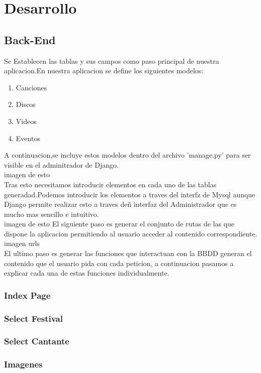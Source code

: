 \section{Desarrollo}
\subsection{Back-End}
Se Establecen las tablas y sus campos como paso principal de nuestra aplicacion.En nuestra aplicacion se define los siguientes modelos:
\begin{enumerate}
\item Canciones
\item Discos
\item Videos
\item Eventos
\end{enumerate}
A continuacion,se incluye estos modelos dentro del archivo 'manage.py' para ser visible en el adminitrador de Django.
\\imagen de esto
\\Tras esto necesitamos introducir elementos en cada uno de las tablas generadad.Podemos introducir los elementos a traves del interfz de Mysql aunque Django permite realizar esto a traves deñ interfaz del Administrador que es mucho mas sencillo e intuitivo.
\\imagen de esto
El siguiente paso es generar el conjunto de rutas de las que dispone la aplicacion permitiendo al usuario acceder al contenido correspondiente.
\\imagen urls
\\El ultimo paso es generar las funciones que interactuan con la BBDD generan el contenido que el usuario pida con cada peticion, a continuacion pasamos a explicar cada una de estas funciones individualmente.
\subsubsection*{Index Page}

\subsubsection*{Select Festival}

\subsubsection*{Select Cantante}

\subsubsection*{Imagenes}

